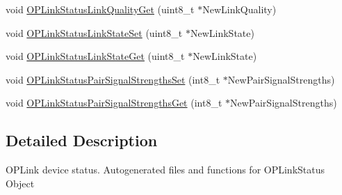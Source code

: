 \begin{DoxyCompactItemize}
\item 
void \hyperlink{group___o_p_link_status_gaa34dd597c0cddce8da35be1a88492c28}{\-O\-P\-Link\-Status\-Link\-Quality\-Get} (uint8\-\_\-t $\ast$\-New\-Link\-Quality)
\item 
void \hyperlink{group___o_p_link_status_gadd61e894603002edf77bb7ee7e985363}{\-O\-P\-Link\-Status\-Link\-State\-Set} (uint8\-\_\-t $\ast$\-New\-Link\-State)
\item 
void \hyperlink{group___o_p_link_status_gae1adb9a97433db2f59af80238c61ebe9}{\-O\-P\-Link\-Status\-Link\-State\-Get} (uint8\-\_\-t $\ast$\-New\-Link\-State)
\item 
void \hyperlink{group___o_p_link_status_ga839e5ff34aabf904300d5aaba4a61752}{\-O\-P\-Link\-Status\-Pair\-Signal\-Strengths\-Set} (int8\-\_\-t $\ast$\-New\-Pair\-Signal\-Strengths)
\item 
void \hyperlink{group___o_p_link_status_ga910babbab85302556b3ead5ab9de2a6b}{\-O\-P\-Link\-Status\-Pair\-Signal\-Strengths\-Get} (int8\-\_\-t $\ast$\-New\-Pair\-Signal\-Strengths)
\end{DoxyCompactItemize}


\subsection{\-Detailed \-Description}
\-O\-P\-Link device status. \-Autogenerated files and functions for \-O\-P\-Link\-Status \-Object 

